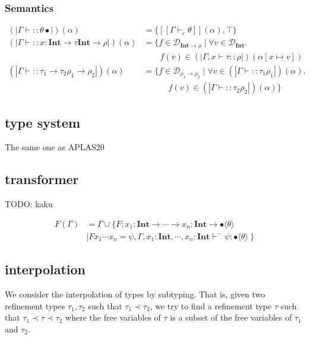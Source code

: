 \documentclass[runningheads]{llncs}
\newcommand {\val}[1]{[\![#1]\!]}
\newcommand {\domain}[1]{\mathcal{D}_{#1}}
\newcommand \stypeint {\textbf{Int}}
\newcommand \stypebool {\bullet}
\newcommand \srtype {\rho} %
\newcommand \constraint {\theta}
\newcommand \refty {\tau}
\newcommand \typeint[1]{{#1} : \stypeint}
\newcommand \typebool[1]{\stypebool \langle #1 \rangle}
\newcommand \refines[2]{#1:: #2}
\newcommand \tenv {\Gamma}
\newcommand \wf[2][]{\tenv \vdash \refines{#1}{#2}}
\newcommand {\semt}[1]{(\!|#1|\!)}
\newcommand {\srt}[2]{\semt{\wf{#1}{#2}}(\alpha)}
\begin{document}
\subsubsection{Semantics}

\begin{align*}
    \srt{\constraint}{\stypebool} &= \{\val{\tenv \vdash_c \constraint}(\alpha), \top \}\\
    \srt{\typeint{x} \rightarrow \refty}{\stypeint \rightarrow \srtype} &=
      \{f \in \domain{\stypeint \rightarrow \srtype} \mid \forall v \in \domain{\stypeint}. \\
          &\quad \quad f(v) \in \semt{\tenv, x \vdash \refty:: \srtype}(\alpha[x \mapsto v])\\
    \srt{\refty_1 \rightarrow \refty_2}{\srtype_1 \rightarrow \srtype_2} &= \{f \in \domain{\srtype_1 \rightarrow \srtype_2} \mid \forall v \in
        \srt{\refty_1}{\srtype_1}. \\
          &\quad \quad \quad f(v) \in \srt{\refty_2}{\srtype_2}\}
\end{align*}

\subsection{type system}

The same one as APLAS20

\subsection{transformer}

TODO: kaku

\begin{align*}
    F(\Gamma)
    &= \Gamma \cup \{ F: \typeint{x_1} \rightarrow \cdots
    \rightarrow \typeint{x_n} \rightarrow \typebool{\theta} \\
    &\mid
    F x_1 \cdots x_n = \psi, \Gamma, x_1: \stypeint, \cdots, x_n: \stypeint
    \vdash^{-} \psi: \typebool{\theta}\ \}
\end{align*}

\subsection{interpolation}

We consider the interpolation of types by subtyping. That is, given two
refinement types \( \tau_1, \tau_2\) such that \( \tau_1 \prec \tau_2 \),
we try to find a refinement type \( \tau \) such that \( \tau_1 \prec \tau \prec
\tau_2 \) where the free variables of \( \tau \) is a subset of the free
variables of \( \tau_1 \) and \( \tau_2 \).
\end{document}
